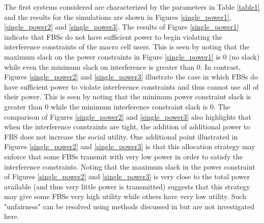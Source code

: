 The first systems considered are characterized by the parameters in Table \ref{table1} and the results for the simulations are shown in Figures \ref{single_power1}, \ref{single_power2} and \ref{single_power3}. The results of Figure \ref{single_power1} indicate that FBSs do not have sufficient power to begin violating the interference constraints of the macro cell users. This is seen by noting that the maximum slack on the power constraints in Figure \ref{single_power1} is $0$ (no slack) while even the minimum slack on interference is greater than $0$. In contrast, Figures \ref{single_power2} and \ref{single_power3} illustrate the case in which FBSs do have sufficient power to violate interference constraints and thus cannot use all of their power. This is seen by noting that the minimum power constraint slack is greater than 0 while the minimum interference constraint slack is $0$. The comparison of Figures \ref{single_power2} and \ref{single_power3} also highlights that when the interference constraints are tight, the addition of additional power to FBS does not increase the social utility. One additional point illustrated in Figures \ref{single_power2} and \ref{single_power3} is that this allocation strategy may enforce that some FBSs transmit with very low power in order to satisfy the interference constraints. Noting that the maximum slack in the power constraint of Figures \ref{single_power2} and \ref{single_power3} is very close to the total power available (and thus very little power is transmitted) suggests that this strategy may give some FBSs very high utility while others have very low utility. Such "unfairness" can be resolved using methods discussed in \cite{kelly1998rate} but are not investigated here.


